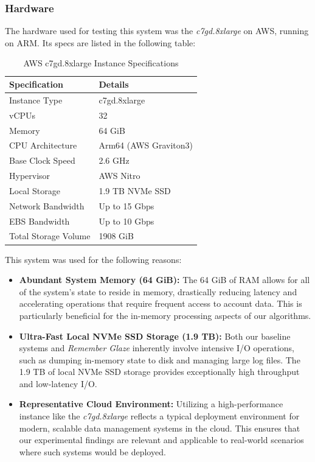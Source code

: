 \documentclass[conference]{IEEEtran}
\begin{document}
\subsubsection{Hardware}
The hardware used for testing this system was the \textit{c7gd.8xlarge} on AWS, running on ARM. Its specs are listed in the following table:
\begin{table}[ht]
\centering
\caption{AWS c7gd.8xlarge Instance Specifications}
\begin{tabular}{|l|l|}
\hline
\textbf{Specification} & \textbf{Details} \\
\hline
Instance Type & c7gd.8xlarge \\
\hline
vCPUs & 32 \\
\hline
Memory & 64 GiB \\
\hline
CPU Architecture & Arm64 (AWS Graviton3) \\
\hline
Base Clock Speed & 2.6 GHz \\
\hline
Hypervisor & AWS Nitro \\
\hline
Local Storage & 1.9 TB NVMe SSD \\
\hline
Network Bandwidth & Up to 15 Gbps \\
\hline
EBS Bandwidth & Up to 10 Gbps \\
\hline
Total Storage Volume & 1908 GiB\\
\hline
\end{tabular}
\end{table}

This system was used for the following reasons:

\begin{itemize}
    \item \textbf{Abundant System Memory (64 GiB):} The 64 GiB of RAM allows for all of the system's state to reside in memory, drastically reducing latency and accelerating operations that require frequent access to account data. This is particularly beneficial for the in-memory processing aspects of our algorithms.
    \item \textbf{Ultra-Fast Local NVMe SSD Storage (1.9 TB):} Both our baseline systems and \textit{Remember Glaze} inherently involve intensive I/O operations, such as dumping in-memory state to disk and managing large log files. The 1.9 TB of local NVMe SSD storage provides exceptionally high throughput and low-latency I/O.
    \item \textbf{Representative Cloud Environment:} Utilizing a high-performance instance like the \textit{c7gd.8xlarge} reflects a typical deployment environment for modern, scalable data management systems in the cloud. This ensures that our experimental findings are relevant and applicable to real-world scenarios where such systems would be deployed.
\end{itemize}
\end{document}
